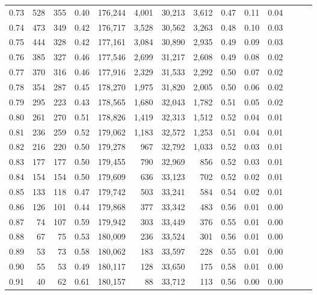 \begin{tabular}{rrrrrrrrrrrrrr}
0.73 &    528 &    355 &  0.40 &  176,244 &    4,001 &  30,213 &   3,612 &  0.47 &  0.11 &      0.04 \\
0.74 &    473 &    349 &  0.42 &  176,717 &    3,528 &  30,562 &   3,263 &  0.48 &  0.10 &      0.03 \\
0.75 &    444 &    328 &  0.42 &  177,161 &    3,084 &  30,890 &   2,935 &  0.49 &  0.09 &      0.03 \\
0.76 &    385 &    327 &  0.46 &  177,546 &    2,699 &  31,217 &   2,608 &  0.49 &  0.08 &      0.02 \\
0.77 &    370 &    316 &  0.46 &  177,916 &    2,329 &  31,533 &   2,292 &  0.50 &  0.07 &      0.02 \\
0.78 &    354 &    287 &  0.45 &  178,270 &    1,975 &  31,820 &   2,005 &  0.50 &  0.06 &      0.02 \\
0.79 &    295 &    223 &  0.43 &  178,565 &    1,680 &  32,043 &   1,782 &  0.51 &  0.05 &      0.02 \\
0.80 &    261 &    270 &  0.51 &  178,826 &    1,419 &  32,313 &   1,512 &  0.52 &  0.04 &      0.01 \\
0.81 &    236 &    259 &  0.52 &  179,062 &    1,183 &  32,572 &   1,253 &  0.51 &  0.04 &      0.01 \\
0.82 &    216 &    220 &  0.50 &  179,278 &      967 &  32,792 &   1,033 &  0.52 &  0.03 &      0.01 \\
0.83 &    177 &    177 &  0.50 &  179,455 &      790 &  32,969 &     856 &  0.52 &  0.03 &      0.01 \\
0.84 &    154 &    154 &  0.50 &  179,609 &      636 &  33,123 &     702 &  0.52 &  0.02 &      0.01 \\
0.85 &    133 &    118 &  0.47 &  179,742 &      503 &  33,241 &     584 &  0.54 &  0.02 &      0.01 \\
0.86 &    126 &    101 &  0.44 &  179,868 &      377 &  33,342 &     483 &  0.56 &  0.01 &      0.00 \\
0.87 &     74 &    107 &  0.59 &  179,942 &      303 &  33,449 &     376 &  0.55 &  0.01 &      0.00 \\
0.88 &     67 &     75 &  0.53 &  180,009 &      236 &  33,524 &     301 &  0.56 &  0.01 &      0.00 \\
0.89 &     53 &     73 &  0.58 &  180,062 &      183 &  33,597 &     228 &  0.55 &  0.01 &      0.00 \\
0.90 &     55 &     53 &  0.49 &  180,117 &      128 &  33,650 &     175 &  0.58 &  0.01 &      0.00 \\
0.91 &     40 &     62 &  0.61 &  180,157 &       88 &  33,712 &     113 &  0.56 &  0.00 &      0.00 \\

\end{tabular}
